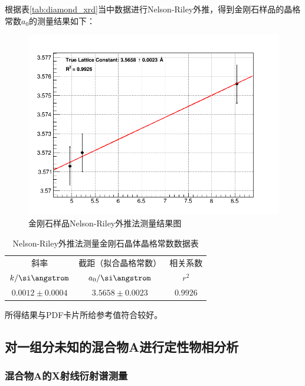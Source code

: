 \documentclass{thuemp}
\begin{document}
根据表\ref{tab:diamond_xrd}当中数据进行Nelson-Riley外推，得到金刚石样品的晶格常数$a_0$的测量结果如下：  

\begin{figure}[H]
    \centering
    \includegraphics[width=0.8\linewidth]{../Data/Fit_diamond_xrd.png}
    \caption{金刚石样品Nelson-Riley外推法测量结果图}
    \label{fig:diamond_xrd_extrapol}
\end{figure}

\begin{table}[H]
    \centering
    \captionnamefont{\wuhao\bf\heiti}
    \captiontitlefont{\wuhao\bf\heiti}
    \caption{Nelson-Riley外推法测量金刚石晶体晶格常数数据表}
    \label{tab:diamond_xrd_extrapol}
    \liuhao
    \begin{tabular}{ccc}
        \toprule
        斜率 & 截距（拟合晶格常数） & 相关系数 \\
        $k/\text{\si\angstrom}$ & $a_0/\text{\si\angstrom}$ & $r^2$\\
        \midrule
        $0.0012 \pm 0.0004$ & $3.5658 \pm 0.0023$ & $0.9926$ \\
        \bottomrule
    \end{tabular}
\end{table}

所得结果与PDF卡片所给参考值符合较好。


\subsection{对一组分未知的混合物A进行定性物相分析}

\subsubsection{混合物A的X射线衍射谱测量}
\end{document}
